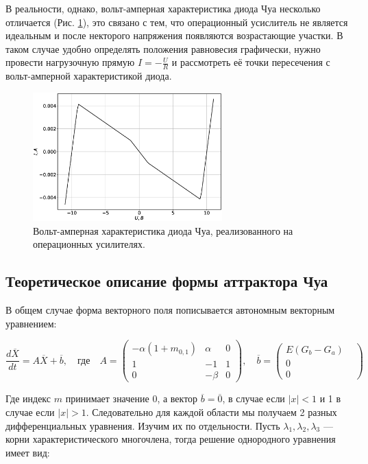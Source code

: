 \documentclass[12pt]{article}
\begin{document}
В реальности, однако, вольт-амперная характеристика диода Чуа несколько отличается (Рис. \ref{fig:VAC}), это
связано с тем, что операционный усислитель не является идеальным и после некторого напряжения появляются возрастающие участки.
В таком случае удобно определять положения равновесия графически, нужно провести нагрузочную прямую $I = -\frac{U}{R}$ и рассмотреть
её точки пересечения с вольт-амперной характеристикой диода.
\begin{figure}[H]
	\centering
	\includegraphics[width=0.65\textwidth]{VAC.eps}
	\caption{Вольт-амперная характеристика диода Чуа, реализованного на операционных усилителях.}
	\label{fig:VAC}
\end{figure}


\subsection*{Теоретическое описание формы аттрактора Чуа}

В общем случае форма векторного поля пописывается  автономным векторным уравнением:

\begin{equation}
	\frac{d\overline{X}}{dt} = A\overline{X} + \overline{b}, \quad \textit{где}
	\quad A=
	\begin{pmatrix}
		-\alpha(1+m_{0, 1}) & \alpha & 0 \\
		1                   & -1     & 1 \\
		0                   & -\beta & 0
	\end{pmatrix},
	\quad \overline{b} =
	\begin{pmatrix}
		E(G_b - G_a) \\
		0 &          \\
		0 &
	\end{pmatrix}
\end{equation}


Где индекс $m$ принимает значение 0, а вектор $\overline{b}=\overline{0}$, 
в случае если $|x| < 1$ и 1 в случае если  $|x| > 1$. 
Следовательно для каждой области мы получаем 2 разных дифференциальных уравнения. 
Изучим их по отдельности. Пусть $\lambda_1, \lambda_2, \lambda_3$ --- корни характеристического многочлена, 
тогда решение однородного уравнения имеет вид:
\end{document}

